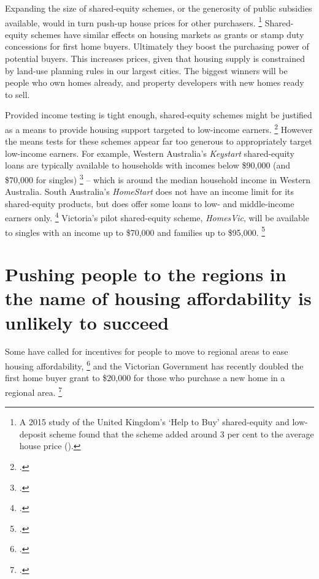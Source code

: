 Expanding the size of shared-equity schemes, or the generosity of public subsidies available, would in turn push-up house prices for other purchasers.%
	\footnote{A 2015 study of the United Kingdom's `Help to Buy' shared-equity and low-deposit scheme found that the scheme added around 3 per cent to the average house price (\textcite{Shelter-2015-How-much-help-is-Help-To-Buy}).}
Shared-equity schemes have similar effects on housing markets as grants or stamp duty concessions for first home buyers.
Ultimately they boost the purchasing power of potential buyers.
This increases prices, given that housing supply is constrained by land-use planning rules in our largest cities.
The biggest winners will be people who own homes already, and property developers with new homes ready to sell.

Provided income testing is tight enough, shared-equity schemes might be justified as a means to provide housing support targeted to low-income earners.%
	\footcite[][9]{Rowley-etal-2017-Govt-led-innovations-affordable-housing-delivery}
However the means tests for these schemes appear far too generous to appropriately target low-income earners.
For example, Western Australia's \emph{Keystart} shared-equity loans are typically available to households with incomes below \$90,000 (and \$70,000 for singles)%
	\footcite{Keystart-2017-SharedState-home-loan}
-- which is around the median household income in Western Australia. South Australia's \emph{HomeStart} does not have an income limit for its shared-equity products, but does offer some loans to low- and middle-income earners only.%
	\footcite{Home-Start-Finance-2012-Extra-help-for-low-income-earners}
Victoria's pilot shared-equity scheme, \emph{HomesVic}, will be available to singles with an income up to \$70,000 and families up to \$95,000.%
	\footcite{Vic-Shared-equity-2017}

\section{Pushing people to the regions in the name of housing affordability is unlikely to succeed}\label{sec:pushing-people-to-the-regions-in-the-name-of-housing-affordability-is-unlikely-to-succeed}

Some have called for incentives for people to move to regional areas to ease housing affordability,%
    \footcite{ABC-2017-Barnaby-urges-aspiring-homeowners-look-beyond-Syd}
and the Victorian Government has recently doubled the first home buyer grant to \$20,000 for those who purchase a new home in a regional area.%
	\footcite{Vic-SRO-2017-FHOG-FAQs}

